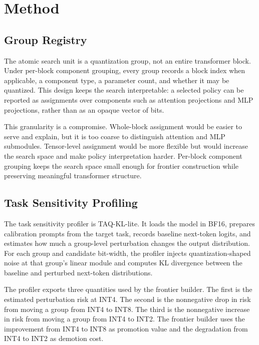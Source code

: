 \documentclass{article}
\newcommand{\inttwo}{INT2}
\newcommand{\intfour}{INT4}
\newcommand{\inteight}{INT8}
\begin{document}
\section{Method}

\subsection{Group Registry}

The atomic search unit is a quantization group, not an entire transformer block. Under per-block component grouping, every group records a block index when applicable, a component type, a parameter count, and whether it may be quantized. This design keeps the search interpretable: a selected policy can be reported as assignments over components such as attention projections and MLP projections, rather than as an opaque vector of bits.

This granularity is a compromise. Whole-block assignment would be easier to serve and explain, but it is too coarse to distinguish attention and MLP submodules. Tensor-level assignment would be more flexible but would increase the search space and make policy interpretation harder. Per-block component grouping keeps the search space small enough for frontier construction while preserving meaningful transformer structure.

\subsection{Task Sensitivity Profiling}

The task sensitivity profiler is TAQ-KL-lite. It loads the model in BF16, prepares calibration prompts from the target task, records baseline next-token logits, and estimates how much a group-level perturbation changes the output distribution. For each group and candidate bit-width, the profiler injects quantization-shaped noise at that group's linear module and computes KL divergence between the baseline and perturbed next-token distributions.

The profiler exports three quantities used by the frontier builder. The first is the estimated perturbation risk at \intfour{}. The second is the nonnegative drop in risk from moving a group from \intfour{} to \inteight{}. The third is the nonnegative increase in risk from moving a group from \intfour{} to \inttwo{}. The frontier builder uses the improvement from \intfour{} to \inteight{} as promotion value and the degradation from \intfour{} to \inttwo{} as demotion cost.
\end{document}
